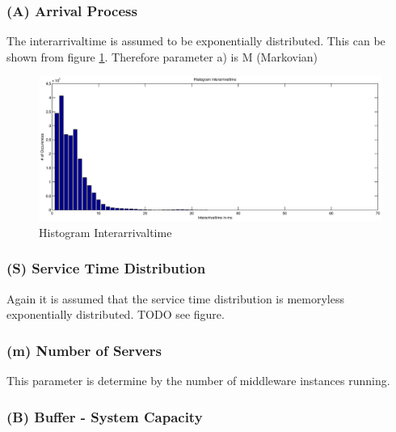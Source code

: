 \documentclass[a4paper]{article}
\begin{document}
\subsubsection{(A) Arrival Process}

The interarrivaltime is assumed to be exponentially distributed. This can be shown from figure \ref{fig:interarrivaltime}. Therefore parameter a) is M (Markovian)



\begin{figure}[H]
	\begin{center}
    \includegraphics[scale=0.5]{../plots-ms2-mg/interarrivaltime.eps}
  \end{center}
  \caption{Histogram Interarrivaltime}
  \label{fig:interarrivaltime}
\end{figure}



\subsubsection{(S) Service Time Distribution }

Again it is assumed that the service time distribution is memoryless exponentially distributed. TODO see figure.

\subsubsection{(m) Number of Servers}

This parameter is determine by the number of middleware instances running.

\subsubsection{(B) Buffer - System Capacity }
\end{document}
